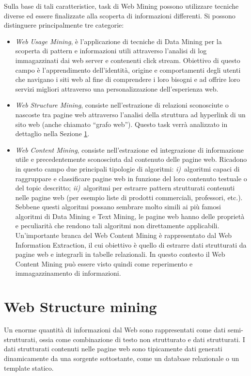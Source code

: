 Sulla base di tali caratteristice, task di Web Mining possono utilizzare tecniche diverse ed essere finalizzate alla scoperta di informazioni differenti. Si possono distinguere principalmente tre categorie:
\begin{itemize}
\item \textit{Web Usage Mining}, è l’applicazione di tecniche di Data Mining per la scoperta di pattern e informazioni utili attraverso l'analisi di log immagazzinati dai web server e contenenti click stream. 
Obiettivo di questo campo è l'apprendimento dell'identità, origine e comportamenti degli utenti che navigano i siti web al fine di comprendere i loro bisogni e ad offrire loro servizi migliori attraverso una personalizzazione dell'esperienza web.
\item \textit{Web Structure Mining}, consiste nell'estrazione di relazioni sconosciute o nascoste tra pagine web attraverso l'analisi della struttura ad hyperlink di un sito web (anche chiamato ``grafo web''). Questo task verrà analizzato in dettaglio nella Sezione \ref{subsec:webstructure}.
\item \textit{Web Content Mining}, consiste nell'estrazione ed integrazione di informazione utile e precedentemente sconosciuta dal contenuto delle pagine web. Ricadono in questo campo due principali tipologie di algoritmi: \textit{i)}~algoritmi capaci di raggruppare e classificare pagine web in funzione del loro contenuto testuale o del topic descritto; \textit{ii)}~algoritmi per estrarre pattern strutturati contenuti nelle pagine web (per esempio liste di prodotti commerciali, professori, etc.).  
Sebbene questi algoritmi possano sembrare molto simili ai più famosi algoritmi di Data Mining e Text Mining, le pagine web hanno delle proprietà e peculiarità che rendono tali algoritmi non direttamente applicabili. Un'importante branca del Web Content Mining è rappresentato dal Web Information Extraction, il cui obiettivo è quello di estrarre dati strutturati da pagine web e integrarli in tabelle relazionali. In questo contesto il Web Content Mining può essere visto quindi come reperimento e immagazzinamento di informazioni.
\end{itemize}


\section{Web Structure mining}
\label{subsec:webstructure}
Un enorme quantità di informazioni dal Web sono rappresentati come dati semi-strutturati, ossia come combinazione di testo non strutturato e dati strutturati. I dati strutturati contenuti nelle pagine web sono tipicamente dati generati dinamicamente da una sorgente sottostante, come un database relazionale o un template statico.

